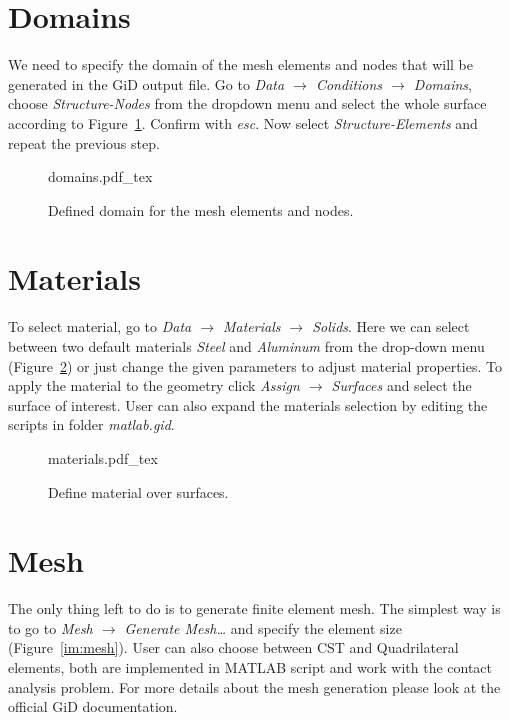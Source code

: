 \documentclass[10pt,a4paper]{article}
\begin{document}
\section{Domains}

We need to specify the domain of the mesh elements and nodes that will be generated in the GiD output file. Go to \textit{Data $\rightarrow$ Conditions $\rightarrow$ Domains}, choose \textit{Structure-Nodes} from the dropdown menu and select the whole surface according to Figure~\ref{im:domains}. Confirm with \textit{esc}. Now select \textit{Structure-Elements} and repeat the previous step.

\begin{figure}[ht]
	\centering
	\footnotesize
    \def\svgwidth{0.9\textwidth}{domains.pdf_tex}
	\caption{Defined domain for the mesh elements and nodes.}
	\label{im:domains}
\end{figure}


\section{Materials}

To select material, go to \textit{Data $\rightarrow$ Materials $\rightarrow$ Solids}. Here we can select between two default materials \textit{Steel} and \textit{Aluminum} from the drop-down menu (Figure~\ref{im:materials}) or just change the given parameters to adjust material properties. To apply the material to the geometry click \textit{Assign $\rightarrow$ Surfaces} and select the surface of interest. User can also expand the materials selection by editing the scripts in folder \textit{matlab.gid}.

\begin{figure}[ht]
	\centering
	\footnotesize
    \def\svgwidth{0.9\textwidth}{materials.pdf_tex}
	\caption{Define material over surfaces.}
	\label{im:materials}
\end{figure}


\section{Mesh}

The only thing left to do is to generate finite element mesh. The simplest way is to go to \textit{Mesh $\rightarrow$ Generate Mesh…} and specify the element size (Figure~\ref{im:mesh}). User can also choose between CST and Quadrilateral elements, both are implemented in MATLAB script and work with the contact analysis problem. For more details about the mesh generation please look at the official GiD documentation.
\end{document}
